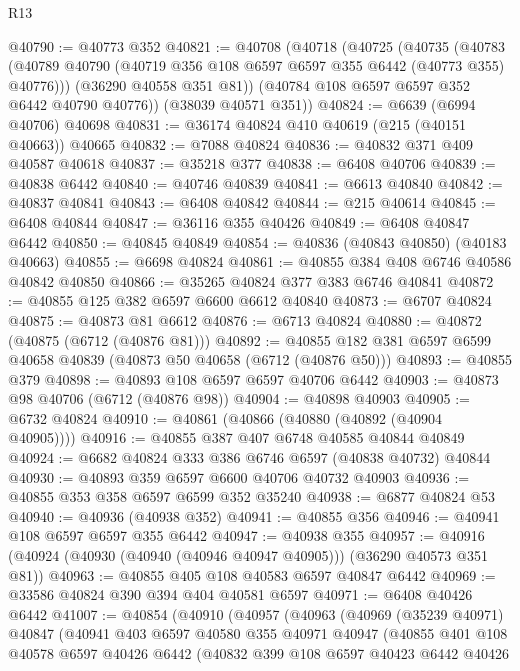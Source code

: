 \begin{lexlean}{R13}
\begin{coremodule}
@40790 := @40773 @352
@40821 := @40708
    (@40718
      (@40725
        (@40735
          (@40783 (@40789 @40790 (@40719 @356 @108 @6597 @6597 @355 @6442 (@40773 @355) @40776)))
          (@36290 @40558 @351 @81))
        (@40784 @108 @6597 @6597 @352 @6442 @40790 @40776))
      (@38039 @40571 @351))
@40824 := @6639 (@6994 @40706) @40698
@40831 := @36174 @40824 @410 @40619 (@215 (@40151 @40663)) @40665
@40832 := @7088 @40824
@40836 := @40832 @371 @409 @40587 @40618
@40837 := @35218 @377
@40838 := @6408 @40706
@40839 := @40838 @6442
@40840 := @40746 @40839
@40841 := @6613 @40840
@40842 := @40837 @40841
@40843 := @6408 @40842
@40844 := @215 @40614
@40845 := @6408 @40844
@40847 := @36116 @355 @40426
@40849 := @6408 @40847 @6442
@40850 := @40845 @40849
@40854 := @40836 (@40843 @40850) (@40183 @40663)
@40855 := @6698 @40824
@40861 := @40855 @384 @408 @6746 @40586 @40842 @40850
@40866 := @35265 @40824 @377 @383 @6746 @40841
@40872 := @40855 @125 @382 @6597 @6600 @6612 @40840
@40873 := @6707 @40824
@40875 := @40873 @81 @6612
@40876 := @6713 @40824
@40880 := @40872 (@40875 (@6712 (@40876 @81)))
@40892 := @40855 @182 @381 @6597 @6599 @40658 @40839 (@40873 @50 @40658 (@6712 (@40876 @50)))
@40893 := @40855 @379
@40898 := @40893 @108 @6597 @6597 @40706 @6442
@40903 := @40873 @98 @40706 (@6712 (@40876 @98))
@40904 := @40898 @40903
@40905 := @6732 @40824
@40910 := @40861 (@40866 (@40880 (@40892 (@40904 @40905))))
@40916 := @40855 @387 @407 @6748 @40585 @40844 @40849
@40924 := @6682 @40824 @333 @386 @6746 @6597 (@40838 @40732) @40844
@40930 := @40893 @359 @6597 @6600 @40706 @40732 @40903
@40936 := @40855 @353 @358 @6597 @6599 @352 @35240
@40938 := @6877 @40824 @53
@40940 := @40936 (@40938 @352)
@40941 := @40855 @356
@40946 := @40941 @108 @6597 @6597 @355 @6442
@40947 := @40938 @355
@40957 := @40916 (@40924 (@40930 (@40940 (@40946 @40947 @40905))) (@36290 @40573 @351 @81))
@40963 := @40855 @405 @108 @40583 @6597 @40847 @6442
@40969 := @33586 @40824 @390 @394 @404 @40581 @6597
@40971 := @6408 @40426 @6442
@41007 := @40854
    (@40910
      (@40957
        (@40963
          (@40969
            (@35239 @40971)
            @40847
            (@40941
              @403
              @6597
              @40580
              @355
              @40971
              @40947
              (@40855
                @401
                @108
                @40578
                @6597
                @40426
                @6442
                (@40832
                  @399
                  @108
                  @6597
                  @40423
                  @6442
                  @40426

\end{coremodule}
\end{lexlean}
